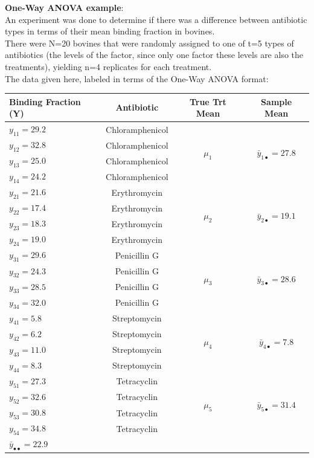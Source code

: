 \textbf{One-Way ANOVA example}:\\
An experiment was done to determine if there was a difference between antibiotic types in terms of their mean binding fraction in bovines.  \\
There were N=20 bovines that were randomly assigned to one of t=5 types of antibiotics (the levels of the factor, since only one factor these levels are also the treatments), yielding n=4 replicates for each treatment. \\
The data given here, labeled in terms of the One-Way ANOVA format:
\begin{center}
\begin{tabular}{lc|cc} 
Binding Fraction (Y) & Antibiotic& True Trt Mean & Sample Mean\\\hline
$y_{11}=29.2$ & Chloramphenicol&\multirow{4}{*}{$\mu_1$}&\multirow{4}{*}{$\bar{y}_{1\bullet}=27.8$}\\
$y_{12}=32.8$ & Chloramphenicol\\
$y_{13}=25.0$ & Chloramphenicol\\
$y_{14}=24.2$ & Chloramphenicol\\\hline
$y_{21}=21.6$ & Erythromycin&\multirow{4}{*}{$\mu_2$}&\multirow{4}{*}{$\bar{y}_{2\bullet}=19.1$}\\
$y_{22}=17.4$ & Erythromycin\\
$y_{23}=18.3$ & Erythromycin\\
$y_{24}=19.0$ & Erythromycin\\\hline
$y_{31}=29.6$ & Penicillin G &\multirow{4}{*}{$\mu_3$}&\multirow{4}{*}{$\bar{y}_{3\bullet}=28.6$}\\
$y_{32}=24.3$ & Penicillin G \\
$y_{33}=28.5$ & Penicillin G \\
$y_{34}=32.0$ & Penicillin G \\\hline
$y_{41}=5.8$ & Streptomycin&\multirow{4}{*}{$\mu_4$}&\multirow{4}{*}{$\bar{y}_{4\bullet}=7.8$}\\
$y_{42}=6.2$ & Streptomycin\\
$y_{43}=11.0$ & Streptomycin\\
$y_{44}=8.3$ & Streptomycin\\\hline
$y_{51}=27.3$ & Tetracyclin&\multirow{4}{*}{$\mu_5$}&\multirow{4}{*}{$\bar{y}_{5\bullet}=31.4$}\\
$y_{52}=32.6$ & Tetracyclin\\
$y_{53}=30.8$ & Tetracyclin\\
$y_{54}=34.8$ & Tetracyclin\\\hline
\multicolumn{4}{l}{$\bar{y}_{\bullet\bullet}=22.9$}\\
\end{tabular}
\end{center}

